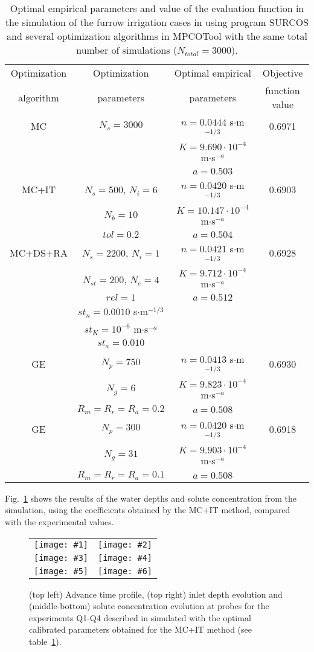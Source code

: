 \documentclass[review,authoryear]{elsarticle}
\newcommand{\TABLE}[5]
{
	\begin{table}[ht!]
		\centering
		\caption{#4.\label{#5}}
		#1
		\begin{tabular}{#2}
			#3
		\end{tabular}
	\end{table}
}
\newcommand{\FIGVI}[8]
{
	\begin{figure}[ht!]
		\centering
		\begin{tabular}{cc}
			\texttt{[image: \#1]} & \texttt{[image: \#2]} \\
			\texttt{[image: \#3]} & \texttt{[image: \#4]} \\
			\texttt{[image: \#5]} & \texttt{[image: \#6]}
		\end{tabular}
		\caption{#7.\label{#8}}
	\end{figure}
}
\begin{document}
\TABLE{\scriptsize}{cccc}
{
	Optimization & Optimization & Optimal empirical & Objective
	\\ algorithm & parameters & parameters & function value
	\\ \hline
	MC & $N_s=3000$ & $n=0.0444$ s$\cdot$m$^{-1/3}$ & 0.6971
	\\ & & $K=9.690\cdot 10^{-4}$ m$\cdot$s$^{-a}$
	\\ & & $a=0.503$
	\\ \hline
	MC+IT & $N_s=500$, $N_i=6$ & $n=0.0420$ s$\cdot$m$^{-1/3}$ & 0.6903
	\\ & $N_b=10$ & $K=10.147\cdot 10^{-4}$ m$\cdot$s$^{-a}$
	\\ & $tol=0.2$ & $a=0.504$
	\\ \hline
	MC+DS+RA & $N_s=2200$, $N_i=1$ & $n=0.0421$ s$\cdot$m$^{-1/3}$ & 0.6928
	\\ & $N_{st}=200$, $N_e=4$ & $K=9.712\cdot 10^{-4}$ m$\cdot$s$^{-a}$
	\\ & $rel=1$ & $a=0.512$
	\\ & $st_n=0.0010$ s$\cdot$m$^{-1/3}$
	\\ & $st_K=10^{-6}$ m$\cdot$s$^{-a}$
	\\ & $st_a=0.010$
	\\ \hline
	GE & $N_p=750$ & $n=0.0413$ s$\cdot$m$^{-1/3}$  & 0.6930
	\\ & $N_g=6$ & $K=9.823\cdot 10^{-4}$ m$\cdot$s$^{-a}$
	\\ & $R_m=R_r=R_a=0.2$ & $a=0.508$
	\\ \hline
	GE & $N_p=300$ & $n=0.0420$ s$\cdot$m$^{-1/3}$  & 0.6918
	\\ & $N_g=31$ & $K=9.903\cdot 10^{-4}$ m$\cdot$s$^{-a}$
	\\ & $R_m=R_r=R_a=0.1$ & $a=0.508$
	\\ \hline
}{Optimal empirical parameters and value of the evaluation function in the simulation of the furrow irrigation cases in \citet{JaviSurcos2} using program SURCOS and several optimization algorithms in MPCOTool with the same total number of simulations ($N_{total}=3000$)}{TabSurcos}

Fig.~\ref{FigSurcos} shows the results of the water depths and solute concentration from the simulation, using the coefficients obtained by the MC+IT method, compared with the experimental values.

\FIGVI{surcos-advance.eps}{surcos-depth.eps}{surcos-solute-q1.eps}
{surcos-solute-q2.eps}{surcos-solute-q3.eps}{surcos-solute-q4.eps}
{(top left) Advance time profile, (top right) inlet depth evolution and
(middle-bottom) solute concentration evolution at probes for the experiments
Q1-Q4 described in \citet{JaviSurcos2} simulated with the optimal calibrated
parameters obtained for the MC+IT method (see table~\ref{TabSurcos})}{FigSurcos}
\end{document}
